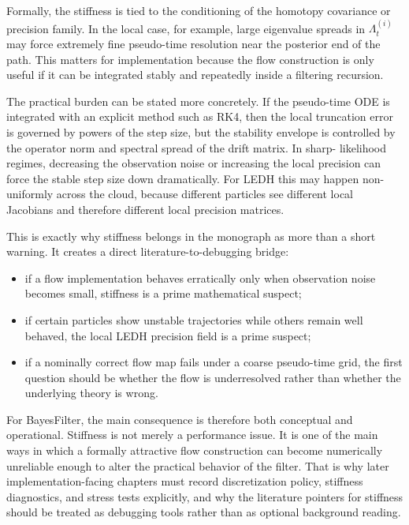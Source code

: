 Formally, the stiffness is tied to the conditioning of the homotopy covariance
or precision family.  In the local case, for example, large eigenvalue spreads
in $\Lambda_t^{(i)}$ may force extremely fine pseudo-time resolution near the
posterior end of the path.  This matters for implementation because the flow
construction is only useful if it can be integrated stably and repeatedly inside
a filtering recursion.

The practical burden can be stated more concretely.  If the pseudo-time ODE is
integrated with an explicit method such as RK4, then the local truncation error
is governed by powers of the step size, but the stability envelope is controlled
by the operator norm and spectral spread of the drift matrix.  In sharp-
likelihood regimes, decreasing the observation noise or increasing the local
precision can force the stable step size down dramatically.  For LEDH this may
happen non-uniformly across the cloud, because different particles see different
local Jacobians and therefore different local precision matrices.

This is exactly why stiffness belongs in the monograph as more than a short
warning.  It creates a direct literature-to-debugging bridge:
\begin{itemize}
  \item if a flow implementation behaves erratically only when observation noise
    becomes small, stiffness is a prime mathematical suspect;
  \item if certain particles show unstable trajectories while others remain well
    behaved, the local LEDH precision field is a prime suspect;
  \item if a nominally correct flow map fails under a coarse pseudo-time grid,
    the first question should be whether the flow is underresolved rather than
    whether the underlying theory is wrong.
\end{itemize}

For BayesFilter, the main consequence is therefore both conceptual and
operational.  Stiffness is not merely a performance issue.  It is one of the
main ways in which a formally attractive flow construction can become
numerically unreliable enough to alter the practical behavior of the filter.
That is why later implementation-facing chapters must record discretization
policy, stiffness diagnostics, and stress tests explicitly, and why the
literature pointers for stiffness should be treated as debugging tools rather
than as optional background reading.

